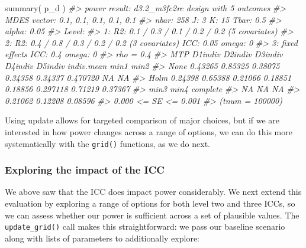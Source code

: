 \documentclass[
]{article}
\newenvironment{Shaded}{\begin{snugshade}}{\end{snugshade}}
\newcommand{\CommentTok}[1]{\textcolor[rgb]{0.56,0.35,0.01}{\textit{#1}}}
\newcommand{\FunctionTok}[1]{\textcolor[rgb]{0.00,0.00,0.00}{#1}}
\newcommand{\NormalTok}[1]{#1}
\begin{document}
\begin{Shaded}
\begin{Highlighting}[]
\FunctionTok{summary}\NormalTok{( p\_d )}
\CommentTok{\#\textgreater{} power result: d3.2\_m3fc2rc design with 5 outcomes}
\CommentTok{\#\textgreater{}   MDES vector: 0.1, 0.1, 0.1, 0.1, 0.1}
\CommentTok{\#\textgreater{}   nbar: 258  J: 3    K: 15   Tbar: 0.5}
\CommentTok{\#\textgreater{}   alpha: 0.05    }
\CommentTok{\#\textgreater{}   Level:}
\CommentTok{\#\textgreater{}     1: R2: 0.1 / 0.3 / 0.1 / 0.2 / 0.2 (5 covariates)}
\CommentTok{\#\textgreater{}     2: R2: 0.4 / 0.8 / 0.3 / 0.2 / 0.2 (3 covariates)    ICC: 0.05   omega: 0}
\CommentTok{\#\textgreater{}     3:   fixed effects   ICC: 0.4    omega: 0}
\CommentTok{\#\textgreater{}   rho = 0.4}
\CommentTok{\#\textgreater{}   MTP D1indiv D2indiv D3indiv D4indiv D5indiv indiv.mean    min1    min2}
\CommentTok{\#\textgreater{}  None 0.43265 0.85325 0.38075 0.34358 0.34337   0.470720      NA      NA}
\CommentTok{\#\textgreater{}  Holm 0.24398 0.65388 0.21066 0.18851 0.18856   0.297118 0.71219 0.37367}
\CommentTok{\#\textgreater{}     min3    min4 complete}
\CommentTok{\#\textgreater{}       NA      NA       NA}
\CommentTok{\#\textgreater{}  0.21062 0.12208  0.08596}
\CommentTok{\#\textgreater{}  0.000 \textless{}= SE \textless{}= 0.001}
\CommentTok{\#\textgreater{}  (tnum = 100000)}
\end{Highlighting}
\end{Shaded}

Using update allows for targeted comparison of major choices, but if we
are interested in how power changes across a range of options, we can do
this more systematically with the \texttt{grid()} functions, as we do
next.

\subsubsection{Exploring the impact of the ICC}

We above saw that the ICC does impact power considerably. We next extend
this evaluation by exploring a range of options for both level two and
three ICCs, so we can assess whether our power is sufficient across a
set of plausible values. The \texttt{update\_grid()} call makes this
straightforward: we pass our baseline scenario along with lists of
parameters to additionally explore:
\end{document}
